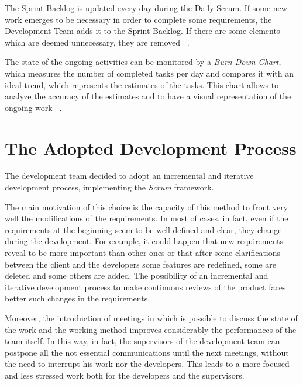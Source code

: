 			The Sprint Backlog is updated every day during the Daily Scrum. If some new work emerges to be necessary in order to complete some requirements, the Development Team adds it to the Sprint Backlog. If there are some elements which are deemed unnecessary, they are removed ~\cite{scrumEnglishGuide}. 

			The state of the ongoing activities can be monitored by a \emph{Burn Down Chart}, which measures the number of completed tasks per day and compares it with an ideal trend, which represents the estimates of the tasks. This chart allows to analyze the accuracy of the estimates and to have a visual representation of the ongoing work ~\cite{scrumEnglishGuide}. 

					
			
	
	
	\section{The Adopted Development Process}
		The development team decided to adopt an incremental and iterative development process, implementing the \emph{Scrum} framework. 

		The main motivation of this choice is the capacity of this method to front very well the modifications of the requirements. 
		In most of cases, in fact, even if the requirements at the beginning seem to be well defined and clear, they change during the development. For example, it could happen that new requirements reveal to be more important than other ones or that after some clarifications between the client and the developers some features are redefined, some are deleted and some others are added. The possibility of an incremental and iterative development process to make continuous reviews of the product faces better such changes in the requirements. 

		Moreover, the introduction of meetings in which is possible to discuss the state of the work and the working method improves considerably the performances of the team itself. In this way, in fact, the supervisors of the development team can postpone all the not essential communications until the next meetings, without the need to interrupt his work nor the developers. This leads to a more focused and less stressed work both for the developers and the supervisors.

